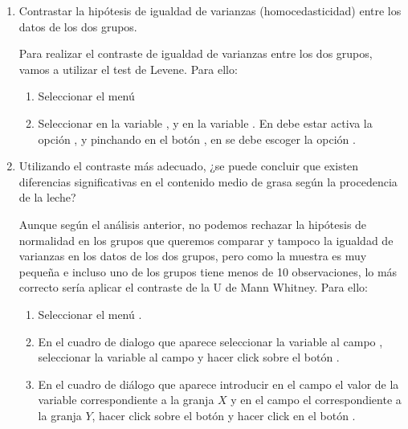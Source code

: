 \begin{description}
\begin{enumerate}[leftmargin=*]
\begin{enumerate}
\item Contrastar la hipótesis de igualdad de varianzas (homocedasticidad) entre los datos de los dos grupos.
\begin{indicacion}
Para realizar el contraste de igualdad de varianzas entre los dos grupos, vamos a utilizar el test de Levene. Para ello:
\begin{enumerate}
\item Seleccionar el menú 
\item Seleccionar en  la variable , y en  la variable . En  debe estar activa la opción , y pinchando en el botón , en  se debe escoger la opción .
\end{enumerate}
\end{indicacion}

\item Utilizando el contraste más adecuado, ¿se puede concluir que existen diferencias significativas en el
contenido medio de grasa según la procedencia de la leche?
\begin{indicacion}
Aunque según el análisis anterior, no podemos rechazar la hipótesis de normalidad en los grupos que queremos comparar y tampoco la igualdad de varianzas en los datos de los dos grupos, pero como la muestra es muy pequeña e incluso uno de los grupos tiene menos de 10 observaciones, lo más correcto sería aplicar el contraste de la U de Mann Whitney. Para ello:
\begin{enumerate}
\item  Seleccionar el menú .
\item En el cuadro de dialogo que aparece seleccionar la variable
 al campo , seleccionar la
variable  al campo  y hacer click sobre el botón .
\item En el cuadro de diálogo que aparece introducir en el campo  el valor de la variable  correspondiente a la granja $X$ y en el campo  el correspondiente a la granja $Y$, hacer click sobre el botón  y hacer click en el botón .
\end{enumerate}
\end{indicacion}
\end{enumerate}



\end{enumerate}
\end{description}
